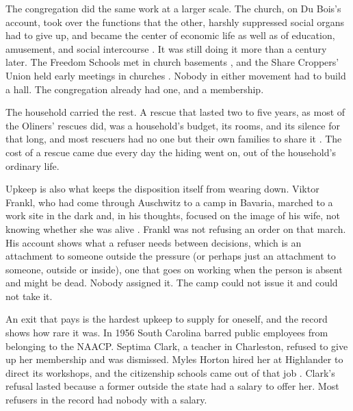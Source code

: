 The congregation did the same work at a larger scale. The church, on Du Bois's account, took over the functions that the other, harshly suppressed social organs had to give up, and became the center of economic life as well as of education, amusement, and social intercourse \autocite[24]{dubois1907economic}. It was still doing it more than a century later. The Freedom Schools met in church basements \autocite{payne1995light}, and the Share Croppers' Union held early meetings in churches \autocite{kelley1990hammer}. Nobody in either movement had to build a hall. The congregation already had one, and a membership.

The household carried the rest. A rescue that lasted two to five years, as most of the Oliners' rescues did, was a household's budget, its rooms, and its silence for that long, and most rescuers had no one but their own families to share it \autocite{oliner1988altruistic}. The cost of a rescue came due every day the hiding went on, out of the household's ordinary life.

Upkeep is also what keeps the disposition itself from wearing down. Viktor Frankl, who had come through Auschwitz to a camp in Bavaria, marched to a work site in the dark and, in his thoughts, focused on the image of his wife, not knowing whether she was alive \autocite{frankl2006meaning}. Frankl was not refusing an order on that march. His account shows what a refuser needs between decisions, which is an attachment to someone outside the pressure (or perhaps just an attachment to someone, outside or inside), one that goes on working when the person is absent and might be dead. Nobody assigned it. The camp could not issue it and could not take it.

An exit that pays is the hardest upkeep to supply for oneself, and the record shows how rare it was. In 1956 South Carolina barred public employees from belonging to the NAACP. Septima Clark, a teacher in Charleston, refused to give up her membership and was dismissed. Myles Horton hired her at Highlander to direct its workshops, and the citizenship schools came out of that job \autocite{clark1986ready,horton1990long}. Clark's refusal lasted because a former outside the state had a salary to offer her. Most refusers in the record had nobody with a salary.


